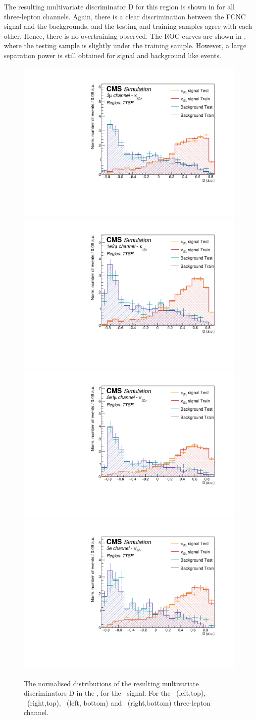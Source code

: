 \clearpage
The resulting multivariate discriminator D for this region is shown in  for all three-lepton channels. Again, there is a clear discrimination between the FCNC signal and the backgrounds, and the testing and training samples agree with each other. Hence, there is no overtraining observed. The ROC curves are shown in , where the testing sample is slightly under the training sample. However, a large separation power is still obtained for signal and background like events. 
\begin{figure}[htbp]
	\centering
	\includegraphics[width=0.49\linewidth]{6_Search/Figures/PlotsTechnics/SigVsBkgTestZuttoppairuuu}
	\includegraphics[width=0.49\linewidth]{6_Search/Figures/PlotsTechnics/SigVsBkgTestZuttoppairuue}
	\includegraphics[width=0.49\linewidth]{6_Search/Figures/PlotsTechnics/SigVsBkgTestZuttoppaireeu}
	\includegraphics[width=0.49\linewidth]{6_Search/Figures/PlotsTechnics/SigVsBkgTestZuttoppaireee}
	\caption{The normalised distributions of the resulting  multivariate discriminators D in the \TTSR, for the \Zut\ signal. For the \mumumu\ (left,top), \emumu\ (right,top), \eemu\ (left, bottom) and \eee\ (right,bottom) three-lepton channel.}
	\label{fig:sigvsbkgtestzuttoppair}
\end{figure}


